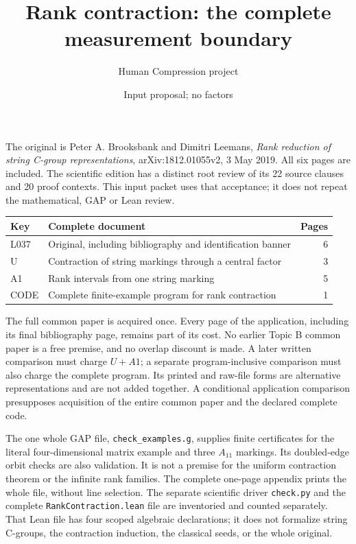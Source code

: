 \documentclass[11pt,a4paper]{article}
\title{Rank contraction: the complete measurement boundary}
\author{Human Compression project}\date{Input proposal; no factors}
\begin{document}
\maketitle
The original is Peter A. Brooksbank and Dimitri Leemans,
\emph{Rank reduction of string C-group representations},
arXiv:1812.01055v2, 3 May 2019. All six pages are included. The
scientific edition has a distinct root review of its 22 source clauses
and 20 proof contexts. This input packet uses that acceptance; it does
not repeat the mathematical, GAP or Lean review.

\begin{center}
\begin{tabular}{llr}\toprule
Key&Complete document&Pages\\\midrule
L037&Original, including bibliography and identification banner&6\\
U&Contraction of string markings through a central factor&3\\
A1&Rank intervals from one string marking&5\\
CODE&Complete finite-example program for rank contraction&1\\\bottomrule
\end{tabular}
\end{center}
The full common paper is acquired once. Every page of the application,
including its final bibliography page, remains part of its cost. No
earlier Topic B common paper is a free premise, and no overlap discount
is made. A later written comparison must charge $U+A1$; a separate
program-inclusive comparison must also charge the complete program.
Its printed and raw-file forms are alternative representations and are
not added together. A conditional application comparison presupposes
acquisition of the entire common paper and the declared complete code.

The one whole GAP file, \texttt{check\_examples.g}, supplies finite
certificates for the literal four-dimensional matrix example and three
$A_{11}$ markings. Its doubled-edge orbit checks are also validation.
It is not a premise for the uniform contraction theorem or the infinite
rank families. The complete one-page appendix prints the whole file,
without line selection. The separate scientific driver \texttt{check.py}
and the complete \texttt{RankContraction.lean} file are inventoried and
counted separately. That Lean file has four scoped algebraic declarations;
it does not formalize string C-groups, the contraction induction, the
classical seeds, or the whole original.
\end{document}
